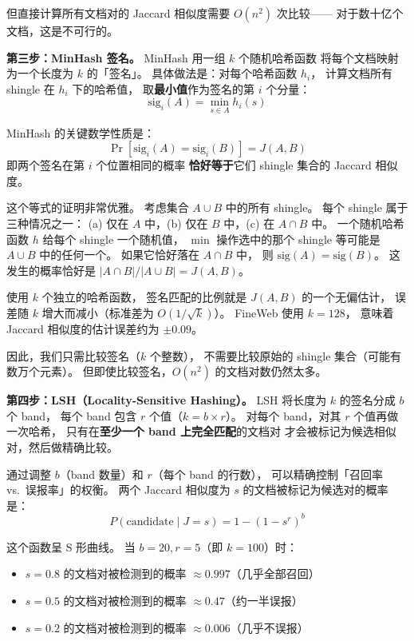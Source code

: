 但直接计算所有文档对的 Jaccard 相似度需要 $O(n^2)$ 次比较——
对于数十亿个文档，这是不可行的。

\textbf{第三步：MinHash 签名。}
MinHash 用一组 $k$ 个随机哈希函数
将每个文档映射为一个长度为 $k$ 的「签名」。
具体做法是：对每个哈希函数 $h_i$，
计算文档所有 shingle 在 $h_i$ 下的哈希值，
取\textbf{最小值}作为签名的第 $i$ 个分量：
\begin{equation}
  \text{sig}_i(A) = \min_{s \in A} h_i(s)
\end{equation}

MinHash 的关键数学性质是：
\begin{equation}
  \Pr[\text{sig}_i(A) = \text{sig}_i(B)] = J(A, B)
\end{equation}
即两个签名在第 $i$ 个位置相同的概率
\textbf{恰好等于}它们 shingle 集合的 Jaccard 相似度。

\begin{whybox}
这个等式的证明非常优雅。
考虑集合 $A \cup B$ 中的所有 shingle。
每个 shingle 属于三种情况之一：
(a) 仅在 $A$ 中，(b) 仅在 $B$ 中，(c) 在 $A \cap B$ 中。
一个随机哈希函数 $h$ 给每个 shingle 一个随机值，
$\min$ 操作选中的那个 shingle
等可能是 $A \cup B$ 中的任何一个。
如果它恰好落在 $A \cap B$ 中，
则 $\text{sig}(A) = \text{sig}(B)$。
这发生的概率恰好是 $|A \cap B| / |A \cup B| = J(A, B)$。

使用 $k$ 个独立的哈希函数，
签名匹配的比例就是 $J(A, B)$ 的一个无偏估计，
误差随 $k$ 增大而减小（标准差为 $O(1/\sqrt{k})$）。
FineWeb 使用 $k = 128$，
意味着 Jaccard 相似度的估计误差约为 $\pm 0.09$。
\end{whybox}

因此，我们只需比较签名（$k$ 个整数），
不需要比较原始的 shingle 集合（可能有数万个元素）。
但即使比较签名，$O(n^2)$ 的文档对数仍然太多。

\textbf{第四步：LSH（Locality-Sensitive Hashing）。}
LSH 将长度为 $k$ 的签名分成 $b$ 个 band，
每个 band 包含 $r$ 个值（$k = b \times r$）。
对每个 band，对其 $r$ 个值再做一次哈希，
只有在\textbf{至少一个 band 上完全匹配}的文档对
才会被标记为候选相似对，然后做精确比较。

通过调整 $b$（band 数量）和 $r$（每个 band 的行数），
可以精确控制「召回率 vs.\ 误报率」的权衡。
两个 Jaccard 相似度为 $s$ 的文档被标记为候选对的概率是：
\begin{equation}
  P(\text{candidate} \mid J = s) = 1 - (1 - s^r)^b
\end{equation}

这个函数呈 S 形曲线。
当 $b = 20, r = 5$（即 $k = 100$）时：
\begin{itemize}[noitemsep]
  \item $s = 0.8$ 的文档对被检测到的概率 $\approx 0.997$（几乎全部召回）
  \item $s = 0.5$ 的文档对被检测到的概率 $\approx 0.47$（约一半误报）
  \item $s = 0.2$ 的文档对被检测到的概率 $\approx 0.006$（几乎不误报）
\end{itemize}

